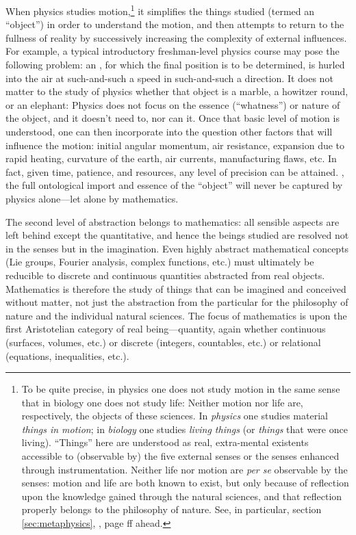 When physics studies motion,\footnote{To be quite precise, in physics one does not study motion in the same sense that in biology one does not study life: Neither motion nor life are, respectively, the objects of these sciences. In \textit{physics} one studies material \textit{things in motion}; in \textit{biology} one studies \textit{living things} (or \textit{things} that were once living). ``Things'' here are understood as real, extra-mental existents accessible to (observable by) the five external senses or the senses enhanced through instrumentation. Neither life nor motion are \textit{per se} observable by the senses: motion and life are both known to exist, but only because of reflection upon the knowledge gained through the natural sciences, and that reflection properly belongs to the philosophy of nature. See, in particular, section \ref{sec:metaphysics}, , page \pageref{page:motion}ff ahead.} it simplifies the things studied (termed an ``object'') in order to understand the motion, and then attempts to return to the fullness of reality by successively increasing the complexity of external influences. For example, a typical introductory freshman-level physics course may pose the following problem: an , for which the final position is to be determined, is hurled into the air at such-and-such a speed in such-and-such a direction. It does not matter to the study of physics whether that object is a marble, a howitzer round, or an elephant: Physics does not focus on the essence (``whatness'') or nature of the object, and it doesn't need to, nor can it. Once that basic level of motion is understood, one can then incorporate into the question other factors that will influence the motion: initial angular momentum, air resistance, expansion due to rapid heating, curvature of the earth, air currents, manufacturing flaws, etc. In fact, given time, patience, and resources, any level of precision can be attained. , the full ontological import and essence of the ``object'' will never be captured by physics alone---let alone by mathematics.

The second level of abstraction belongs to mathematics: all sensible aspects are left behind except the quantitative, and hence the beings studied are resolved not in the senses but in the imagination. Even highly abstract mathematical concepts (Lie groups, Fourier analysis, complex functions, etc.) must ultimately be reducible to discrete and continuous quantities abstracted from real objects. Mathematics is therefore the study of things that can be imagined and conceived without matter, not just the abstraction from the particular for the philosophy of nature and the individual natural sciences. The focus of mathematics is upon the first Aristotelian category of real being---quantity, again whether continuous (surfaces, volumes, etc.) or discrete (integers, countables, etc.) or relational (equations, inequalities, etc.).

